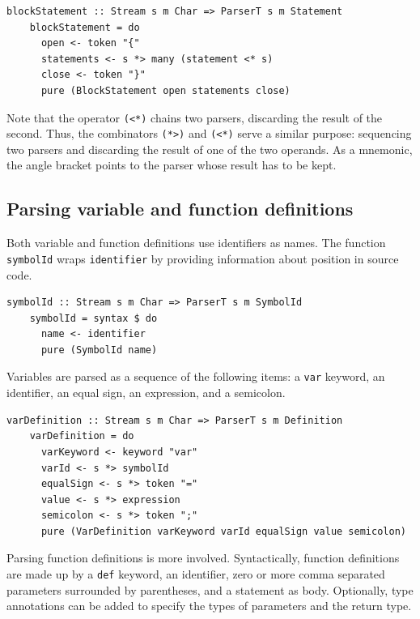 \documentclass[UdineBachThesis,american,11pt]{PhdThesis}
\begin{document}
  \begin{Verbatim}[gobble=4,fontsize=\small]
    blockStatement :: Stream s m Char => ParserT s m Statement
    blockStatement = do
      open <- token "{"
      statements <- s *> many (statement <* s)
      close <- token "}"
      pure (BlockStatement open statements close)
  \end{Verbatim}

  Note that the operator \mbox{\texttt{(<*)}} chains two parsers, discarding the
  result of the second. Thus, the combinators \mbox{\texttt{(*>)}} and
  \mbox{\texttt{(<*)}} serve a similar purpose: sequencing two parsers and
  discarding the result of one of the two operands. As a mnemonic, the angle
  bracket points to the parser whose result has to be kept.

  \newpage

  \subsection{Parsing variable and function definitions}

  Both variable and function definitions use identifiers as names. The function
  \mbox{\texttt{symbolId}} wraps \mbox{\texttt{identifier}} by providing
  information about position in source code.

  \begin{Verbatim}[gobble=4,fontsize=\small]
    symbolId :: Stream s m Char => ParserT s m SymbolId
    symbolId = syntax $ do
      name <- identifier
      pure (SymbolId name)
  \end{Verbatim}

  Variables are parsed as a sequence of the following items: a
  \mbox{\texttt{var}} keyword, an identifier, an equal sign, an expression, and
  a semicolon.

  \begin{Verbatim}[gobble=4,fontsize=\small]
    varDefinition :: Stream s m Char => ParserT s m Definition
    varDefinition = do
      varKeyword <- keyword "var"
      varId <- s *> symbolId
      equalSign <- s *> token "="
      value <- s *> expression
      semicolon <- s *> token ";"
      pure (VarDefinition varKeyword varId equalSign value semicolon)
  \end{Verbatim}

  Parsing function definitions is more involved. Syntactically, function
  definitions are made up by a \mbox{\texttt{def}} keyword, an identifier, zero
  or more comma separated parameters surrounded by parentheses, and a statement
  as body. Optionally, type annotations can be added to specify the types of
  parameters and the return type.
\end{document}

